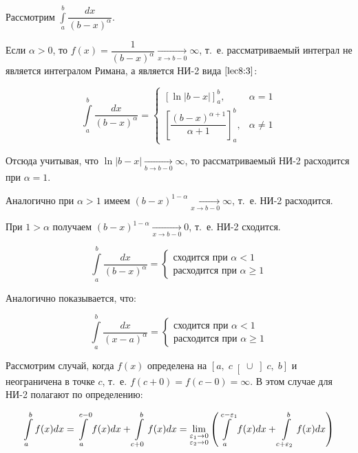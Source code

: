 \documentclass[../../main.tex]{subfiles}
\begin{document}
\begin{exmp}
 Рассмотрим $\displaystyle\int\limits_{a}^{b}\dfrac{dx}{(b - x)^{\alpha}}$.
 
 Если $\alpha > 0$, то $f(x) = \dfrac{1}{(b -x)^{\alpha}} \xrightarrow[x \to b 
 - 0]{} \infty$, т.~е. рассматриваемый интеграл не является интегралом Римана, 
 а является НИ-2 вида $\eqref{lec8:3}$:
 
 \[\int\limits_{a}^{b}\dfrac{dx}{(b - x)^{\alpha}} =
 \begin{cases}
 \left[\ln|b - x|\right]_{a}^{b},& \alpha = 1\\
 \left[\dfrac{(b - x)^{\alpha + 1}}{\alpha + 1}\right]_{a}^{b},& \alpha 
 \neq 1 
\end{cases}\]

Отсюда учитывая, что $\ln|b - x| \xrightarrow[b \to b - 0]{} \infty$, то 
рассматриваемый НИ-2 расходится при $\alpha = 1$.

Аналогично при $\alpha > 1$ имеем $(b - x)^{1- \alpha} \xrightarrow[x \to b - 
0]{} 
\infty$, т.~е. НИ-2 расходится.

При $1 > \alpha$ получаем $(b - x)^{1 - \alpha} \xrightarrow[x \to b - 0]{} 
0$, т.~е. НИ-2 
сходится.

\[\int\limits_{a}^{b} \dfrac{dx}{(b - x)^{\alpha}} = 
\begin{cases}
\text{сходится при } \alpha < 1\\
\text{расходится при } \alpha \geq 1
\end{cases}\]

Аналогично показывается, что:

\[\int\limits_{a}^{b} \dfrac{dx}{(x - a)^{\alpha}} = 
\begin{cases}
\text{сходится при } \alpha < 1\\
\text{расходится при } \alpha \geq 1
\end{cases}\]
\end{exmp}

Рассмотрим случай, когда $f(x)$ определена на $\left[a,\; c \right[ \cup 
\left] c,\; b \right]$ и неограничена в точке $c$, т.~е. $f(c + 0) = f(c - 0) 
= \infty$. В этом случае для НИ-2 полагают по определению:

\begin{equation} \label{lec8:5}
\int\limits_{a}^{b}f(x)dx = \int\limits_{a}^{c - 0}f(x)dx + \int\limits_{c + 
0}^{b}f(x)dx = \lim_{\substack{
\varepsilon_1 \to 0\\
\varepsilon_2 \to 0}}
\left(\int\limits_{a}^{c - \varepsilon_1}f(x)dx + \int\limits_{c + 
\varepsilon_2}^{b}f(x)dx\right)
\end{equation}
\end{document}
